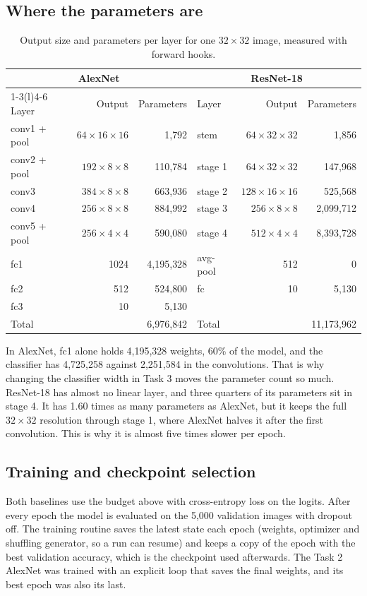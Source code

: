 \documentclass[11pt,a4paper]{article}
\begin{document}
\subsection{Where the parameters are}
\begin{table}[htbp]\centering\small
\caption{Output size and parameters per layer for one $32\times32$ image, measured with forward hooks.}\label{tab:layers}
\begin{tabular}{lrr@{\qquad}lrr}\toprule
\multicolumn{3}{c}{AlexNet} & \multicolumn{3}{c}{ResNet-18}\\\cmidrule(r){1-3}\cmidrule(l){4-6}
Layer & Output & Parameters & Layer & Output & Parameters\\\midrule
conv1 + pool & $64\times16\times16$ & 1{,}792 & stem & $64\times32\times32$ & 1{,}856\\
conv2 + pool & $192\times8\times8$ & 110{,}784 & stage 1 & $64\times32\times32$ & 147{,}968\\
conv3 & $384\times8\times8$ & 663{,}936 & stage 2 & $128\times16\times16$ & 525{,}568\\
conv4 & $256\times8\times8$ & 884{,}992 & stage 3 & $256\times8\times8$ & 2{,}099{,}712\\
conv5 + pool & $256\times4\times4$ & 590{,}080 & stage 4 & $512\times4\times4$ & 8{,}393{,}728\\
fc1 & 1024 & 4{,}195{,}328 & avg-pool & 512 & 0\\
fc2 & 512 & 524{,}800 & fc & 10 & 5{,}130\\
fc3 & 10 & 5{,}130 & & & \\\midrule
Total & & 6{,}976{,}842 & Total & & 11{,}173{,}962\\\bottomrule
\end{tabular}\end{table}

In AlexNet, fc1 alone holds 4,195,328 weights, 60\% of the model, and the classifier has 4,725,258 against 2,251,584 in the convolutions. That is why changing the classifier width in Task 3 moves the parameter count so much. ResNet-18 has almost no linear layer, and three quarters of its parameters sit in stage 4. It has 1.60 times as many parameters as AlexNet, but it keeps the full $32\times32$ resolution through stage 1, where AlexNet halves it after the first convolution. This is why it is almost five times slower per epoch.

\subsection{Training and checkpoint selection}
Both baselines use the budget above with cross-entropy loss on the logits. After every epoch the model is evaluated on the 5,000 validation images with dropout off. The training routine saves the latest state each epoch (weights, optimizer and shuffling generator, so a run can resume) and keeps a copy of the epoch with the best validation accuracy, which is the checkpoint used afterwards. The Task 2 AlexNet was trained with an explicit loop that saves the final weights, and its best epoch was also its last.
\end{document}
